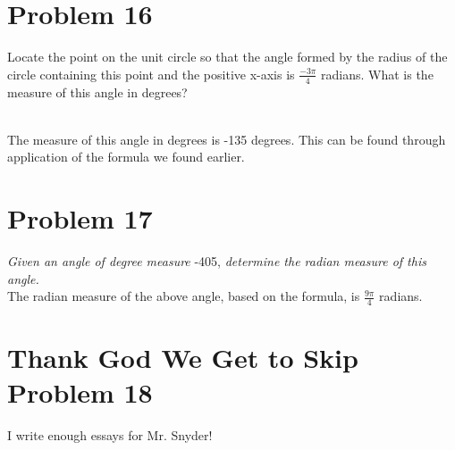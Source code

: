 \documentclass[11pt]{article} %
\newcommand\tab[1][1cm]{\hspace*{#1}}
\begin{document}
\section{Problem 16}
Locate the point on the unit circle so that the angle formed by the radius of the circle containing this point and the positive x-axis is $\frac{-3\pi}{4}$ radians. What is the measure of this angle in degrees? \\
\\The measure of this angle in degrees is -135 degrees. This can be found through application of the formula we found earlier.

\section{Problem 17}
\textit{Given an angle of degree measure} -405, \textit{determine the radian measure of this angle.} \\
\tab The radian measure of the above angle, based on the formula, is $\frac{9\pi}{4}$ radians.

\section{Thank God We Get to Skip Problem 18}
I write enough essays for Mr. Snyder! 
\end{document}
